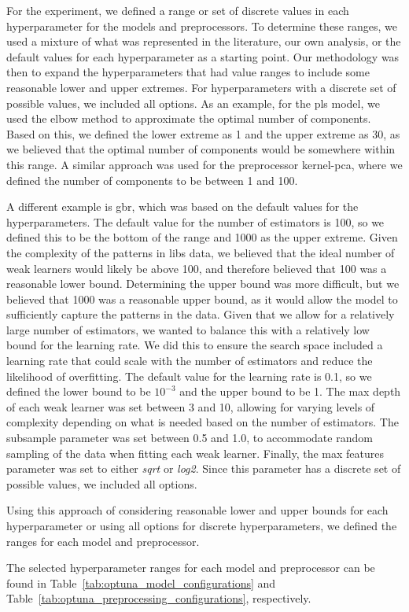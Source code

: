 For the experiment, we defined a range or set of discrete values in each hyperparameter for the models and preprocessors. 
To determine these ranges, we used a mixture of what was represented in the literature, our own analysis, or the default values for each hyperparameter as a starting point. 
Our methodology was then to expand the hyperparameters that had value ranges to include some reasonable lower and upper extremes. 
For hyperparameters with a discrete set of possible values, we included all options. 
As an example, for the \gls{pls} model, we used the elbow method to approximate the optimal number of components. 
Based on this, we defined the lower extreme as 1 and the upper extreme as 30, as we believed that the optimal number of components would be somewhere within this range. 
A similar approach was used for the preprocessor \gls{kernel-pca}, where we defined the number of components to be between 1 and 100.

A different example is \gls{gbr}, which was based on the default values for the hyperparameters.
The default value for the number of estimators is 100, so we defined this to be the bottom of the range and 1000 as the upper extreme. 
Given the complexity of the patterns in \gls{libs} data, we believed that the ideal number of weak learners would likely be above 100, and therefore believed that 100 was a reasonable lower bound. 
Determining the upper bound was more difficult, but we believed that 1000 was a reasonable upper bound, as it would allow the model to sufficiently capture the patterns in the data. 
Given that we allow for a relatively large number of estimators, we wanted to balance this with a relatively low bound for the learning rate. 
We did this to ensure the search space included a learning rate that could scale with the number of estimators and reduce the likelihood of overfitting. 
The default value for the learning rate is 0.1, so we defined the lower bound to be $10^{-3}$ and the upper bound to be 1. 
The max depth of each weak learner was set between 3 and 10, allowing for varying levels of complexity depending on what is needed based on the number of estimators. 
The subsample parameter was set between 0.5 and 1.0, to accommodate random sampling of the data when fitting each weak learner. 
Finally, the max features parameter was set to either \textit{sqrt} or \textit{log2}. Since this parameter has a discrete set of possible values, we included all options.

Using this approach of considering reasonable lower and upper bounds for each hyperparameter or using all options for discrete hyperparameters, we defined the ranges for each model and preprocessor.

The selected hyperparameter ranges for each model and preprocessor can be found in Table~\ref{tab:optuna_model_configurations} and Table~\ref{tab:optuna_preprocessing_configurations}, respectively.


